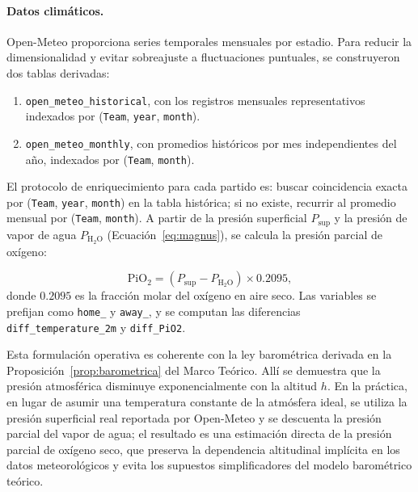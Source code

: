 \paragraph{Datos clim\'aticos.} Open-Meteo proporciona series temporales mensuales por estadio. Para reducir la dimensionalidad y evitar sobreajuste a fluctuaciones puntuales, se construyeron dos tablas derivadas:
\begin{enumerate}
	\item \texttt{open\_meteo\_historical}, con los registros mensuales representativos indexados por (\texttt{Team}, \texttt{year}, \texttt{month}).
	\item \texttt{open\_meteo\_monthly}, con promedios hist\'oricos por mes independientes del a\~no, indexados por (\texttt{Team}, \texttt{month}).
\end{enumerate}
El protocolo de enriquecimiento para cada partido es: buscar coincidencia exacta por (\texttt{Team}, \texttt{year}, \texttt{month}) en la tabla hist\'orica; si no existe, recurrir al promedio mensual por (\texttt{Team}, \texttt{month}). A partir de la presi\'on superficial $P_{\text{sup}}$ y la presi\'on de vapor de agua $P_{\mathrm{H_2O}}$ (Ecuaci\'on~\ref{eq:magnus}), se calcula la presi\'on parcial de ox\'igeno:

\begin{equation}
	\mathrm{PiO_2} = (P_{\text{sup}} - P_{\mathrm{H_2O}}) \times 0{.}2095,
\end{equation}
donde $0{.}2095$ es la fracci\'on molar del ox\'igeno en aire seco. Las variables se prefijan como \texttt{home\_} y \texttt{away\_}, y se computan las diferencias \texttt{diff\_temperature\_2m} y \texttt{diff\_PiO2}.

Esta formulaci\'on operativa es coherente con la ley barom\'etrica derivada en la Proposici\'on~\ref{prop:barometrica} del Marco Te\'orico. All\'i se demuestra que la presi\'on atmosf\'erica disminuye exponencialmente con la altitud $h$. En la pr\'actica, en lugar de asumir una temperatura constante de la atm\'osfera ideal, se utiliza la presi\'on superficial real reportada por Open-Meteo y se descuenta la presi\'on parcial del vapor de agua; el resultado es una estimaci\'on directa de la presi\'on parcial de ox\'igeno seco, que preserva la dependencia altitudinal impl\'icita en los datos meteorol\'ogicos y evita los supuestos simplificadores del modelo barom\'etrico te\'orico.

